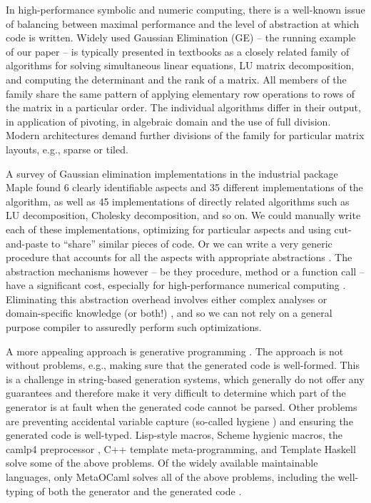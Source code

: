 \documentclass{elsart}
\begin{document}
In high-performance symbolic and numeric computing, there is a
well-known issue of balancing between maximal performance and the
level of abstraction at which code is written. Widely used Gaussian
Elimination (GE) -- the running example of our paper -- is typically
presented in textbooks as a closely related family of algorithms for
solving simultaneous linear equations, LU matrix decomposition, and
computing the determinant and the rank of a matrix. All members of
the family share the same pattern of applying elementary row
operations to rows of the matrix in a particular order. The individual
algorithms differ in their output, in application of pivoting, in
algebraic domain and the use of full division. Modern architectures
demand further divisions of the family for particular matrix layouts, e.g.,
sparse or tiled.

A survey \cite{Carette06} of
Gaussian elimination implementations in the industrial package Maple
\cite{Monagan:2001:M7P}
found 6 clearly identifiable aspects and 35 different implementations of the
algorithm, as well as 45 implementations of directly related
algorithms such as LU decomposition, Cholesky decomposition, and so on.  We
could manually write each of these implementations, optimizing for particular
aspects and using cut-and-paste to ``share'' similar pieces of code.
Or we can write a very generic procedure that accounts for
all the aspects with appropriate abstractions \cite{Gruntz:1994:IG,Axiom}. The
abstraction mechanisms however -- be they procedure, method or a
function call -- have a significant cost, especially for
high-performance numerical computing \cite{Carette06}. Eliminating
this abstraction overhead involves either complex analyses or
domain-specific knowledge (or both!)
\cite{Kennedy01Telescoping,Veldhuizen:2004,scp-CohenDGHKP06},
and so we can not rely on a general
purpose compiler to assuredly perform such optimizations.

A more appealing approach is generative programming
\cite{Czarnecki,Veldhuizen:1998:ISCOPE,musser89generic,musser94algorithmoriented,BOOST,POOMA,ATLAS}.
The approach is not without problems, e.g., making sure that the
generated code is well-formed. This is a challenge in string-based
generation systems, which generally do not offer any guarantees and
therefore make it very difficult to determine which part of the
generator is at fault when the generated code cannot be parsed. Other
problems are preventing accidental variable capture (so-called hygiene
\cite{HygienicMacros}) and ensuring the generated code is
well-typed. Lisp-style macros, Scheme hygienic macros, the camlp4
preprocessor \cite{camlp4}, C++ template meta-programming, and Template
Haskell \cite{conf/dagstuhl/CzarneckiOST03} solve some of the above
problems. Of the widely available maintainable languages, only
MetaOCaml \cite{CTHL03,metaocaml-org}  solves all of the above problems,
including the well-typing of both the generator and 
the generated code \cite{TahaSheard97,TahaThesis}.
\end{document}
